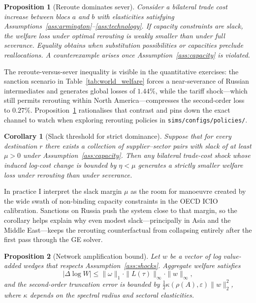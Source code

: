 \documentclass[12pt]{article}
\newtheorem{proposition}{Proposition}
\newtheorem{corollary}{Corollary}
\begin{document}
\begin{proposition}[Reroute dominates sever]\label{prop:reroute}
Consider a bilateral trade cost increase between blocs $a$ and $b$ with elasticities satisfying Assumptions~\ref{ass:armington}--\ref{ass:technology}. If capacity constraints are slack, the welfare loss under optimal rerouting is weakly smaller than under full severance. Equality obtains when substitution possibilities or capacities preclude reallocations. A counterexample arises once Assumption~\ref{ass:capacity} is violated.
\end{proposition}

The reroute-versus-sever inequality is visible in the quantitative exercises: the sanction scenario in Table~\ref{tab:world_welfare} forces a near-severance of Russian intermediates and generates global losses of $1.44\%$, while the tariff shock---which still permits rerouting within North America---compresses the second-order loss to $0.27\%$. Proposition~\ref{prop:reroute} rationalises that contrast and pins down the exact channel to watch when exploring rerouting policies in \texttt{sims/configs/policies/}.

\begin{corollary}[Slack threshold for strict dominance]\label{cor:reroute_strict}
Suppose that for every destination $r$ there exists a collection of supplier--sector pairs with slack of at least $\mu>0$ under Assumption~\ref{ass:capacity}. Then any bilateral trade-cost shock whose induced log-cost change is bounded by $\eta<\mu$ generates a strictly smaller welfare loss under rerouting than under severance.
\end{corollary}

In practice I interpret the slack margin $\mu$ as the room for manoeuvre created by the wide swath of non-binding capacity constraints in the OECD ICIO calibration. Sanctions on Russia push the system close to that margin, so the corollary helps explain why even modest slack—principally in Asia and the Middle East—keeps the rerouting counterfactual from collapsing entirely after the first pass through the GE solver.

\begin{proposition}[Network amplification bound]\label{prop:network}
Let $w$ be a vector of log value-added wedges that respects Assumption~\ref{ass:shocks}. Aggregate welfare satisfies
\begin{equation}
    \bigl|\Delta \log W\bigr| \leq \|\omega\|_1 \cdot \|L(\tau)\|_{\infty} \cdot \|w\|_{\infty},
\end{equation}
and the second-order truncation error is bounded by $\frac{1}{2}\kappa(\rho(A),\varepsilon)\|w\|_2^2$, where $\kappa$ depends on the spectral radius and sectoral elasticities.
\end{proposition}
\end{document}
